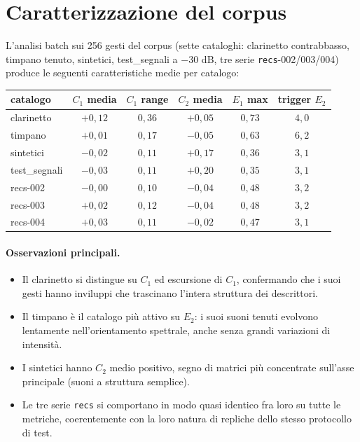 \documentclass[a4paper,11pt]{article}
\begin{document}
\section{Caratterizzazione del corpus}

L'analisi batch sui 256 gesti del corpus (sette cataloghi: clarinetto
contrabbasso, timpano tenuto, sintetici, test\_segnali a $-30$ dB, tre
serie \texttt{recs}-002/003/004) produce le seguenti caratteristiche
medie per catalogo:

\begin{center}
\begin{tabular}{lccccc}
\toprule
catalogo & $C_1$ media & $C_1$ range & $C_2$ media & $E_1$ max & trigger $E_2$\\
\midrule
clarinetto       & $+0{,}12$ & $0{,}36$ & $+0{,}05$ & $0{,}73$ & $4{,}0$\\
timpano          & $+0{,}01$ & $0{,}17$ & $-0{,}05$ & $0{,}63$ & $6{,}2$\\
sintetici        & $-0{,}02$ & $0{,}11$ & $+0{,}17$ & $0{,}36$ & $3{,}1$\\
test\_segnali    & $-0{,}03$ & $0{,}11$ & $+0{,}20$ & $0{,}35$ & $3{,}1$\\
recs-002         & $-0{,}00$ & $0{,}10$ & $-0{,}04$ & $0{,}48$ & $3{,}2$\\
recs-003         & $+0{,}02$ & $0{,}12$ & $-0{,}04$ & $0{,}48$ & $3{,}2$\\
recs-004         & $+0{,}03$ & $0{,}11$ & $-0{,}02$ & $0{,}47$ & $3{,}1$\\
\bottomrule
\end{tabular}
\end{center}

\paragraph{Osservazioni principali.}

\begin{itemize}
  \item Il clarinetto si distingue su $C_1$ ed escursione di $C_1$,
        confermando che i suoi gesti hanno inviluppi che trascinano
        l'intera struttura dei descrittori.
  \item Il timpano è il catalogo più attivo su $E_2$: i suoi suoni
        tenuti evolvono lentamente nell'orientamento spettrale, anche
        senza grandi variazioni di intensità.
  \item I sintetici hanno $C_2$ medio positivo, segno di matrici più
        concentrate sull'asse principale (suoni a struttura semplice).
  \item Le tre serie \texttt{recs} si comportano in modo quasi identico
        fra loro su tutte le metriche, coerentemente con la loro natura
        di repliche dello stesso protocollo di test.
\end{itemize}
\end{document}
